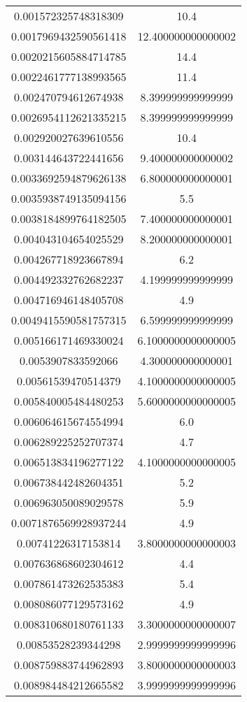 \begin{table}
\begin{tabular}{S[]S[]}
0.001572325748318309 & 10.4\\
0.0017969432590561418 & 12.400000000000002\\
0.0020215605884714785 & 14.4\\
0.0022461777138993565 & 11.4\\
0.002470794612674938 & 8.399999999999999\\
0.0026954112621335215 & 8.399999999999999\\
0.002920027639610556 & 10.4\\
0.003144643722441656 & 9.400000000000002\\
0.0033692594879626138 & 6.800000000000001\\
0.0035938749135094156 & 5.5\\
0.0038184899764182505 & 7.400000000000001\\
0.004043104654025529 & 8.200000000000001\\
0.004267718923667894 & 6.2\\
0.004492332762682237 & 4.199999999999999\\
0.004716946148405708 & 4.9\\
0.0049415590581757315 & 6.599999999999999\\
0.005166171469330024 & 6.1000000000000005\\
0.0053907833592066 & 4.300000000000001\\
0.00561539470514379 & 4.1000000000000005\\
0.005840005484480253 & 5.6000000000000005\\
0.006064615674554994 & 6.0\\
0.006289225252707374 & 4.7\\
0.006513834196277122 & 4.1000000000000005\\
0.006738442482604351 & 5.2\\
0.006963050089029578 & 5.9\\
0.0071876569928937244 & 4.9\\
0.00741226317153814 & 3.8000000000000003\\
0.007636868602304612 & 4.4\\
0.007861473262535383 & 5.4\\
0.008086077129573162 & 4.9\\
0.008310680180761133 & 3.3000000000000007\\
0.00853528239344298 & 2.9999999999999996\\
0.008759883744962893 & 3.8000000000000003\\
0.008984484212665582 & 3.9999999999999996\\

\end{tabular}
\end{table}
